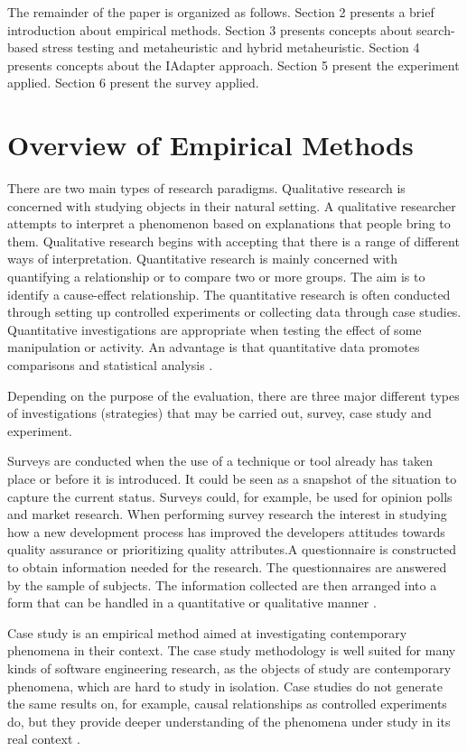 The remainder of the paper is organized as follows. Section 2 presents a brief introduction about empirical methods. Section 3 presents concepts about  search-based stress testing and metaheuristic and hybrid metaheuristic. Section 4 presents concepts about the IAdapter approach. Section 5 present the experiment applied. Section 6 present the survey applied.




\section{ Overview of Empirical Methods }

There are two main types of research paradigms. Qualitative research is concerned with studying objects in their
natural setting. A qualitative researcher attempts to interpret a phenomenon based on explanations that people bring to them. Qualitative research begins with accepting that there is a range of different ways of interpretation. Quantitative research is mainly concerned with quantifying a relationship or to compare two or more groups. The aim is to identify a cause-effect relationship. The quantitative research is often conducted through setting up controlled experiments or collecting data through case studies. Quantitative investigations are appropriate when testing the effect of some manipulation or activity. An advantage is that quantitative data promotes comparisons and statistical analysis \cite{Wohlin2003}. 

Depending on the purpose of the evaluation, there are three major different types of investigations (strategies) that may be carried out, survey, case study and experiment.

Surveys are conducted when the use of a technique or tool already has taken place or before it is introduced. It could be seen as a snapshot of the situation to capture the current status. Surveys could, for example, be used for opinion polls and market research. When performing survey research the interest  in studying how a new development process has improved the developers attitudes towards quality assurance or prioritizing quality attributes.A questionnaire is constructed to obtain information needed for the research. The questionnaires are answered by the sample of subjects. The information collected are then arranged into a form that can be handled in a quantitative or qualitative manner \cite{Wohlin2003}.


Case study is an empirical method aimed at investigating contemporary phenomena in their context. The case study methodology is well suited for many kinds of software engineering research, as the objects of study are contemporary phenomena, which are hard to study in isolation. Case studies do not generate the same results on, for example, causal relationships as controlled experiments do, but they provide deeper understanding of the phenomena under study in its real context \cite{Wohlin2013}.


